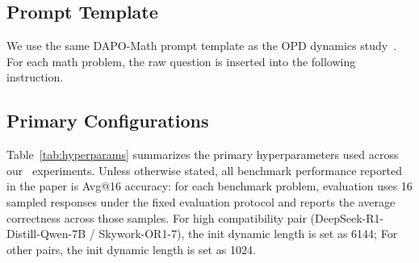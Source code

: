 \subsection{Prompt Template}
\label{app:prompt-template}

We use the same DAPO-Math prompt template as the OPD dynamics study~\citep{li2026rethinking}.
For each math problem, the raw question is inserted into the following instruction.

\begin{center}
\setlength{\fboxsep}{8pt}
\end{center}

\subsection{Primary Configurations}
Table~\ref{tab:hyperparams} summarizes the primary hyperparameters used across our \method~experiments.
Unless otherwise stated, all benchmark performance reported in the paper is Avg@16 accuracy: for each benchmark problem, evaluation uses 16 sampled responses under the fixed evaluation protocol and reports the average correctness across those samples. For high compatibility pair (DeepSeek-R1-Distill-Qwen-7B / Skywork-OR1-7), the init dynamic length is set as 6144; For other pairs, the init dynamic length is set as 1024.

